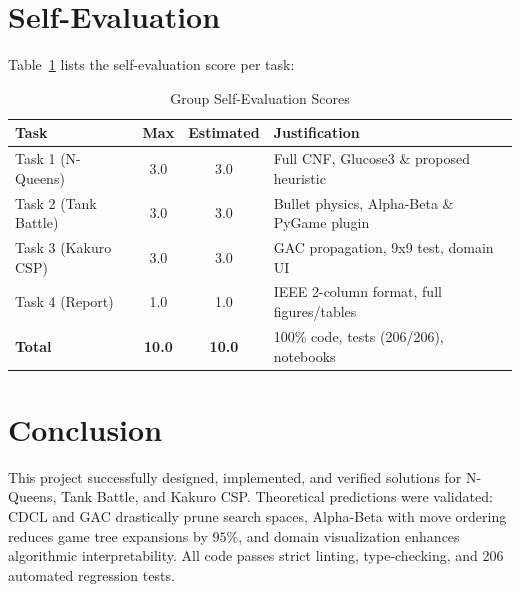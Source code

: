 \documentclass[conference]{IEEEtran}
\begin{document}
\section{Self-Evaluation}
Table~\ref{tab:self_eval} lists the self-evaluation score per task:
\begin{table}[htbp]
\centering
\caption{Group Self-Evaluation Scores}
\label{tab:self_eval}
\begin{tabular}{lccl}
\toprule
Task & Max & Estimated & Justification \\
\midrule
Task 1 (N-Queens) & 3.0 & 3.0 & Full CNF, Glucose3 \& proposed heuristic \\
Task 2 (Tank Battle) & 3.0 & 3.0 & Bullet physics, Alpha-Beta \& PyGame plugin \\
Task 3 (Kakuro CSP) & 3.0 & 3.0 & GAC propagation, 9x9 test, domain UI \\
Task 4 (Report) & 1.0 & 1.0 & IEEE 2-column format, full figures/tables \\
\midrule
\textbf{Total} & \textbf{10.0} & \textbf{10.0} & 100\% code, tests (206/206), notebooks \\
\bottomrule
\end{tabular}
\end{table}

\section{Conclusion}
This project successfully designed, implemented, and verified solutions for N-Queens, Tank Battle, and Kakuro CSP. Theoretical predictions were validated: CDCL and GAC drastically prune search spaces, Alpha-Beta with move ordering reduces game tree expansions by $95\%$, and domain visualization enhances algorithmic interpretability. All code passes strict linting, type-checking, and 206 automated regression tests.

\nocite{*}


\end{document}
